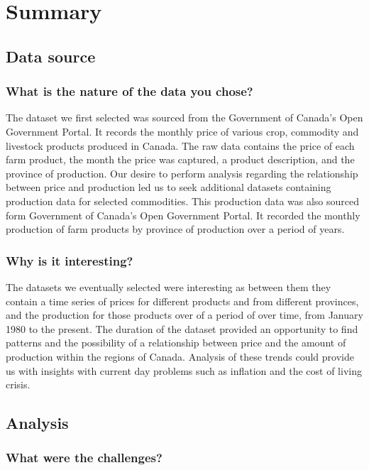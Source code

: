 \section{Summary}

\subsection{Data source}

\subsubsection{What is the nature of the data you chose?}

The dataset we first selected was sourced from the Government of Canada's Open Government Portal. It records the monthly price of various crop, commodity and livestock products produced in Canada. The raw data contains the price of each farm product, the month the price was captured, a product description, and the province of production. Our desire to perform analysis regarding the relationship between price and production led us to seek additional datasets containing production data for selected commodities. This production data was also sourced form Government of Canada's Open Government Portal. It recorded the monthly production of farm products by province of production over a period of years.
\subsubsection{Why is it interesting?}

The datasets we eventually selected were interesting as between them they contain a time series of prices for different products and from different provinces, and the production for those products over of a period of over time, from January 1980 to the present. The duration of the  dataset provided an opportunity to find patterns and the possibility of a relationship between price and the amount of production within the regions of Canada.  Analysis of these trends  could provide us with insights with current day problems such as inflation and the cost of living crisis. 
\subsection{Analysis}

\subsubsection{What were the challenges?}

